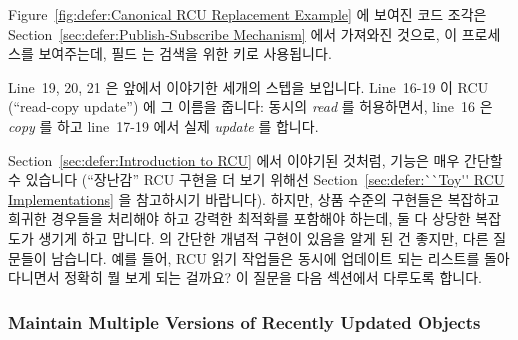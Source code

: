Figure~\ref{fig:defer:Canonical RCU Replacement Example} 에 보여진 코드 조각은
Section~\ref{sec:defer:Publish-Subscribe Mechanism} 에서 가져와진 것으로, 이
프로세스를 보여주는데,  필드  는 검색을 위한 키로 사용됩니다.

Line~19, 20, 21 은 앞에서 이야기한 세개의 스텝을 보입니다.
Line~16-19 이 RCU (``read-copy update'') 에 그 이름을 줍니다: 동시의
\emph{read} 를 허용하면서, line~16 은 \emph{copy} 를 하고 line~17-19 에서 실제
\emph{update} 를 합니다.

Section~\ref{sec:defer:Introduction to RCU} 에서 이야기된 것처럼,
 기능은 매우 간단할 수 있습니다 (``장난감'' RCU 구현을 더
보기 위해선 Section~\ref{sec:defer:``Toy'' RCU Implementations} 을 참고하시기
바랍니다).
하지만, 상품 수준의 구현들은 복잡하고 희귀한 경우들을 처리해야 하고 강력한
최적화를 포함해야 하는데, 둘 다 상당한 복잡도가 생기게 하고 맙니다.
 의 간단한 개념적 구현이 있음을 알게 된 건 좋지만, 다른
질문들이 남습니다.
예를 들어, RCU 읽기 작업들은 동시에 업데이트 되는 리스트를 돌아다니면서 정확히
뭘 보게 되는 걸까요?
이 질문을 다음 섹션에서 다루도록 합니다.

\subsubsection{Maintain Multiple Versions of Recently Updated Objects}
\label{sec:defer:Maintain Multiple Versions of Recently Updated Objects}

